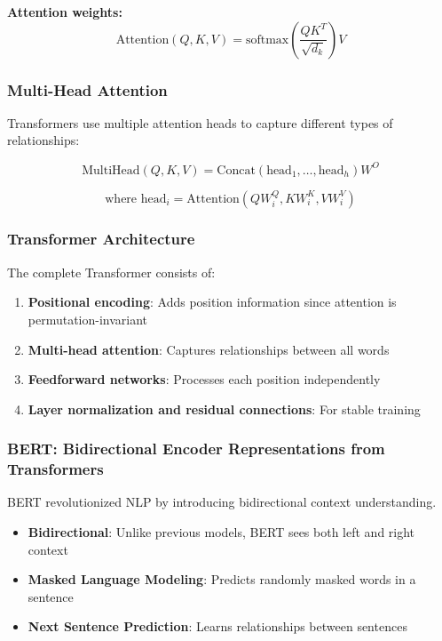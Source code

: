 \documentclass[11pt,a4paper]{article}
\theoremstyle{definition}
\theoremstyle{plain}
\theoremstyle{remark}
\begin{document}
\textbf{Attention weights:}
\[
\text{Attention}(Q,K,V) = \text{softmax}\left(\frac{QK^T}{\sqrt{d_k}}\right)V
\]

\subsubsection{Multi-Head Attention}

Transformers use multiple attention heads to capture different types of relationships:

\[
\text{MultiHead}(Q,K,V) = \text{Concat}(\text{head}_1, \ldots, \text{head}_h)W^O
\]

\[
\text{where } \text{head}_i = \text{Attention}(QW_i^Q, KW_i^K, VW_i^V)
\]

\subsubsection{Transformer Architecture}

The complete Transformer consists of:

\begin{enumerate}
    \item \textbf{Positional encoding}: Adds position information since attention is permutation-invariant
    \item \textbf{Multi-head attention}: Captures relationships between all words
    \item \textbf{Feedforward networks}: Processes each position independently
    \item \textbf{Layer normalization and residual connections}: For stable training
\end{enumerate}

\subsubsection{BERT: Bidirectional Encoder Representations from Transformers}

BERT revolutionized NLP by introducing bidirectional context understanding.

\begin{tcolorbox}[colback=teal!5!white,colframe=teal!75!black,title=\textbf{BERT Key Innovations}]
\begin{itemize}
    \item \textbf{Bidirectional}: Unlike previous models, BERT sees both left and right context
    \item \textbf{Masked Language Modeling}: Predicts randomly masked words in a sentence
    \item \textbf{Next Sentence Prediction}: Learns relationships between sentences
\end{itemize}
\end{tcolorbox}
\end{document}
